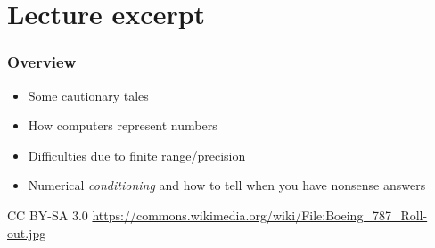 \documentclass[presentation]{beamer}
\begin{document}
\section{Lecture excerpt}

\begin{frame}
  \frametitle{Overview}
  \begin{itemize}
  \item Some cautionary tales
  \item How computers represent numbers
  \item Difficulties due to finite range/precision
  \item Numerical \emph{conditioning} and how to tell when you have
    nonsense answers
  \end{itemize}
\end{frame}

\begin{frame}[plain,t]
  \begin{flushright}
      \tiny CC BY-SA 3.0
      \url{https://commons.wikimedia.org/wiki/File:Boeing_787_Roll-out.jpg}
  \end{flushright}
\end{frame}
\end{document}
